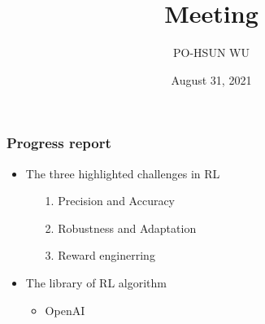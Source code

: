 \documentclass{beamer}
\date{August 31, 2021}
\title{Meeting}
\author{PO-HSUN WU}
\begin{document}
    \frame{\titlepage}

    \begin{frame}
        \frametitle{Progress report}
        \begin{itemize}
            \item The three highlighted challenges in RL
            \begin{enumerate}
                \item[1.] Precision and Accuracy
                \item[2.] Robustness and Adaptation
                \item[3.] Reward enginerring
            \end{enumerate}
            \item The library of RL algorithm
            \begin{itemize}
                \item OpenAI
            \end{itemize}
        \end{itemize}
    \end{frame}
\end{document}
